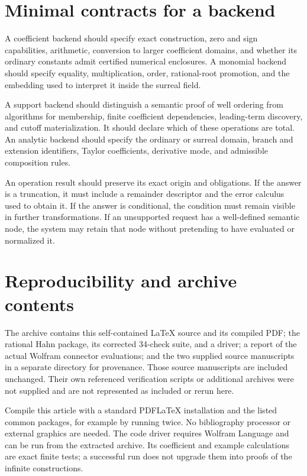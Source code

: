 \documentclass[11pt,letterpaper]{article}
\theoremstyle{definition}
\newcommand{\code}[1]{\texttt{\detokenize{#1}}}
\numberwithin{equation}{section}
\begin{document}
\section{Minimal contracts for a backend}\label{app:contracts}
A coefficient backend should specify exact construction, zero and sign capabilities, arithmetic, conversion to larger coefficient domains, and whether its ordinary constants admit certified numerical enclosures. A monomial backend should specify equality, multiplication, order, rational-root promotion, and the embedding used to interpret it inside the surreal field.

A support backend should distinguish a semantic proof of well ordering from algorithms for membership, finite coefficient dependencies, leading-term discovery, and cutoff materialization. It should declare which of these operations are total. An analytic backend should specify the ordinary or surreal domain, branch and extension identifiers, Taylor coefficients, derivative mode, and admissible composition rules.

An operation result should preserve its exact origin and obligations. If the answer is a truncation, it must include a remainder descriptor and the error calculus used to obtain it. If the answer is conditional, the condition must remain visible in further transformations. If an unsupported request has a well-defined semantic node, the system may retain that node without pretending to have evaluated or normalized it.

\section{Reproducibility and archive contents}\label{app:archive}
The archive contains this self-contained LaTeX source and its compiled PDF; the rational Hahn package, its corrected 34-check suite, and a driver; a report of the actual Wolfram connector evaluations; and the two supplied source manuscripts in a separate \code{sources} directory for provenance. Those source manuscripts are included unchanged. Their own referenced verification scripts or additional archives were not supplied and are not represented as included or rerun here.

Compile this article with a standard PDFLaTeX installation and the listed common packages, for example by running \code{pdflatex surreal_cas.tex} twice. No bibliography processor or external graphics are needed. The code driver requires Wolfram Language and can be run from the extracted archive. Its coefficient and example calculations are exact finite tests; a successful run does not upgrade them into proofs of the infinite constructions.
\end{document}
